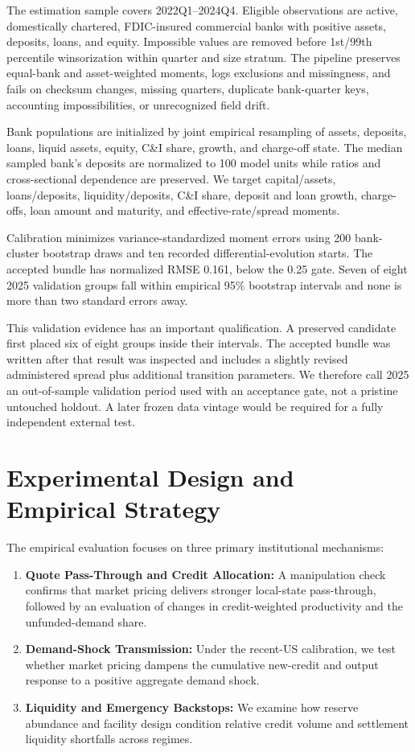 \documentclass[11pt,a4paper]{article}
\begin{document}
The estimation sample covers 2022Q1--2024Q4. Eligible observations are active, domestically chartered, FDIC-insured commercial banks with positive assets, deposits, loans, and equity. Impossible values are removed before 1st/99th percentile winsorization within quarter and size stratum. The pipeline preserves equal-bank and asset-weighted moments, logs exclusions and missingness, and fails on checksum changes, missing quarters, duplicate bank-quarter keys, accounting impossibilities, or unrecognized field drift.

Bank populations are initialized by joint empirical resampling of assets, deposits, loans, liquid assets, equity, C\&I share, growth, and charge-off state. The median sampled bank's deposits are normalized to 100 model units while ratios and cross-sectional dependence are preserved. We target capital/assets, loans/deposits, liquidity/deposits, C\&I share, deposit and loan growth, charge-offs, loan amount and maturity, and effective-rate/spread moments.

Calibration minimizes variance-standardized moment errors using 200 bank-cluster bootstrap draws and ten recorded differential-evolution starts. The accepted bundle has normalized RMSE 0.161, below the 0.25 gate. Seven of eight 2025 validation groups fall within empirical 95\% bootstrap intervals and none is more than two standard errors away.

This validation evidence has an important qualification. A preserved candidate first placed six of eight groups inside their intervals. The accepted bundle was written after that result was inspected and includes a slightly revised administered spread plus additional transition parameters. We therefore call 2025 an out-of-sample validation period used with an acceptance gate, not a pristine untouched holdout. A later frozen data vintage would be required for a fully independent external test.

\section{Experimental Design and Empirical Strategy}

The empirical evaluation focuses on three primary institutional mechanisms:
\begin{enumerate}
    \item \textbf{Quote Pass-Through and Credit Allocation:} A manipulation check confirms that market pricing delivers stronger local-state pass-through, followed by an evaluation of changes in credit-weighted productivity and the unfunded-demand share.
    \item \textbf{Demand-Shock Transmission:} Under the recent-US calibration, we test whether market pricing dampens the cumulative new-credit and output response to a positive aggregate demand shock.
    \item \textbf{Liquidity and Emergency Backstops:} We examine how reserve abundance and facility design condition relative credit volume and settlement liquidity shortfalls across regimes.
\end{enumerate}
\end{document}
